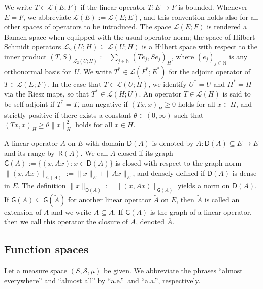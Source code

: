 \documentclass[reqno]{amsart}
\numberwithin{equation}{section}
\newcommand{\N}{\mathbb{N}}
\newcommand{\cS}{\mathcal{S}}
\newcommand{\norm}[2]{     \| #1       \|_{ #2 }}
\newcommand{\scalar}[2]{     ( #1       )_{ #2 }}
\newcommand{\from}{\colon}
\newcommand{\clos}[1]{\overline{ #1 }}
\newcommand{\dual}[1]{#1^*}
\theoremstyle{remark}
\theoremstyle{definition}
\begin{document}
We write ${T \in \mathscr L(E;F)}$ 
if the linear operator 
$T\from E \to F$ is bounded.  
Whenever $E=F$, we 
abbreviate 
$\mathscr L(E) := \mathscr L(E;E)$, 
and this convention holds also 
for all other spaces of operators to be introduced. 
The space $\mathscr L(E;F)$ is rendered 
a Banach space when equipped 
with the usual operator norm; 
the space of Hilbert--Schmidt operators 
$\mathscr L_2(U;H)\subseteq \mathscr L(U;H)$
is a Hilbert space 
with respect to 
the inner product 
$(T,S)_{\mathscr L_2(U;H)} := \sum_{j \in \N}(Te_j, Se_j)_H$, 
where
$(e_j)_{j\in\N}$ is any orthonormal basis for~$U$.  
We write ${\dual T \in \mathscr L(\dual F; \dual E)}$ 
for the adjoint operator of $T\in \mathscr L(E;F)$. 
In the case that $T \in \mathscr L(U;H)$,  
we identify $\dual U = U$ 
and $\dual H = H$ via the Riesz 
maps, so that  
$\dual T\in \mathscr L(H;U)$. 
An operator $T\in\mathscr L(H)$ 
is said to be 
self-adjoint 
if $\dual T = T$, 
non-negative 
if $\scalar{Tx,x}{H}\geq 0$ holds for all $x\in H$, 
and strictly positive if 
there exists a constant  $\theta\in(0,\infty)$ such that 
$\scalar{Tx,x}{H} \geq \theta \|x\|_H^2$ 
holds for all $x\in H$.  

A linear operator $A$ on $E$ with domain $\mathsf D(A)$ 
is denoted by ${A\from \mathsf D(A) \subseteq E \to E}$  
and its range by~$\mathsf R(A)$. 
We call $A$ closed if its graph 
$\mathsf G(A):= {\{(x,Ax): x \in \mathsf D(A)\}}$ 
is closed with respect to the graph norm 
$\norm{(x,Ax)}{\mathsf G(A)} := \norm{x}{E} + \norm{Ax}{E}$, 
and densely defined if $\mathsf D(A)$ is dense in $E$. 
The definition 
$\norm{x}{\mathsf D(A)} := \norm{(x,Ax)}{\mathsf G(A)}$ 
yields a norm on $\mathsf D(A)$. 
If $\mathsf G(A) \subseteq \mathsf G(\widetilde A)$ 
for another linear operator $\widetilde A$ on $E$, 
then $\widetilde A$ is called an extension of $A$ 
and we write $A \subseteq \widetilde A$. 
If $\clos{\mathsf G(A)}$ is the graph of a linear operator, 
then we call this operator the closure of $A$, denoted $\clos A$.


\subsection{Function spaces}

Let a measure space $(S, \cS, \mu)$ be given. 
We abbreviate the phrases 
``almost everywhere'' and 
``almost all'' 
by 
``a.e.''\ and ``a.a.''\!,  
respectively. 
\end{document}
